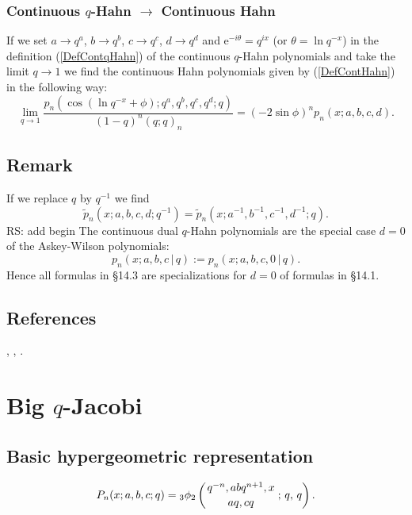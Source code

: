 \documentclass[envcountchap,graybox]{svmono}
\newcommand{\qhyp}[5]{\mbox{}_{#1}{\phi}_{#2}
\left(\genfrac{}{}{0pt}{}{#3}{#4}\,;\,q,\,#5\right)}
\newcommand{\e}{\textrm{e}}
\newcommand{\qhyp}[5]{\,\mbox{}_{#1}\phi_{#2}\!\left(
  \genfrac{}{}{0pt}{}{#3}{#4};#5\right)}
\begin{document}
\subsubsection*{Continuous $q$-Hahn $\rightarrow$ Continuous Hahn}
If we set $a\rightarrow q^a$, $b\rightarrow q^b$, $c\rightarrow q^c$, $d\rightarrow q^d$
and $\e^{-i\theta}=q^{ix}$ (or $\theta=\ln q^{-x}$) in the definition (\ref{DefContqHahn})
of the continuous $q$-Hahn polynomials and take the limit $q\rightarrow 1$ we find
the continuous Hahn polynomials given by (\ref{DefContHahn}) in the following way:
\begin{equation}
\lim_{q\rightarrow 1}\frac{p_n(\cos(\ln q^{-x}+\phi);q^a,q^b,q^c,q^d;q)}
{(1-q)^n(q;q)_n}=(-2\sin\phi)^np_n(x;a,b,c,d).
\end{equation}

\newpage

\subsection*{Remark}
If we replace $q$ by $q^{-1}$ we find
$${\tilde p}_n(x;a,b,c,d;q^{-1})={\tilde p}_n(x;a^{-1},b^{-1},c^{-1},d^{-1};q).$$
 RS: add begin\label{sec14.3}
The continuous dual $q$-Hahn polynomials are the special case $d=0$ of the
Askey-Wilson polynomials:
\[
p_n(x;a,b,c\,|\, q):=p_n(x;a,b,c,0\,|\, q).
\]
Hence all formulas in \S14.3 are specializations for $d=0$ of formulas in \S14.1.
%

\subsection*{References}
\cite{AndrewsAskey85}, \cite{AskeyWilson85}, \cite{GasperRahman90}.


\section{Big $q$-Jacobi}
\par\setcounter{equation}{0}

\subsection*{Basic hypergeometric representation}
\begin{equation}
\label{DefBigqJacobi}
P_n(x;a,b,c;q)=\qhyp{3}{2}{q^{-n},abq^{n+1},x}{aq,cq}{q}.
\end{equation}
\end{document}
